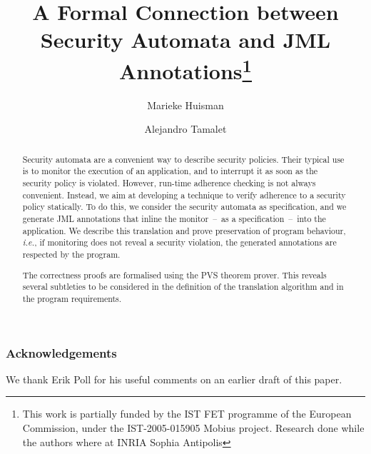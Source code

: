 \documentclass[]{llncs}
\title{A Formal Connection between Security Automata and JML
Annotations\thanks{This work is partially funded by the IST FET
programme of the European Commission, under the IST-2005-015905
\textsf{Mobius} project. Research done while the authors where at INRIA Sophia
Antipolis}}
\author{Marieke Huisman\inst{1}
 \and Alejandro Tamalet\inst{2}}
\institute{University of Twente, Netherlands \and
University of Nijmegen, Netherlands}
\begin{document}
\maketitle
\begin{abstract}
Security automata are a convenient way to describe security
policies. Their typical use is to monitor the execution of an
application, and to interrupt it as soon as the security policy is
violated. However, run-time adherence checking is not always
convenient. Instead, we aim at developing a technique to verify
adherence to a security policy statically.  To do this, we consider
the security automata as specification, and we generate JML
annotations that inline the monitor~--~as a specification~--~into the
application.  We describe this translation and prove preservation of
program behaviour, \emph{i.e.}, if monitoring does not reveal a
security violation, the generated annotations are respected by the
program.

The correctness proofs are formalised using the PVS theorem prover.
This reveals several subtleties to be considered in the definition of the
translation algorithm and in the program requirements.
\end{abstract}












\vspace*{-0.8em}
\subsubsection*{Acknowledgements}
We thank Erik Poll for his useful comments on an earlier draft of this paper.
\end{document}
